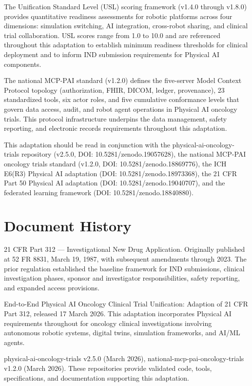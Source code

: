 \documentclass[11pt]{article}
\begin{document}
The Unification Standard Level (USL) scoring framework (v1.4.0 through v1.8.0) provides quantitative readiness assessments for robotic platforms across four dimensions: simulation switching, AI integration, cross-robot sharing, and clinical trial collaboration. USL scores range from 1.0 to 10.0 and are referenced throughout this adaptation to establish minimum readiness thresholds for clinical deployment and to inform IND submission requirements for Physical AI components.

The national MCP-PAI standard (v1.2.0) defines the five-server Model Context Protocol topology (authorization, FHIR, DICOM, ledger, provenance), 23 standardized tools, six actor roles, and five cumulative conformance levels that govern data access, audit, and robot agent operations in Physical AI oncology trials. This protocol infrastructure underpins the data management, safety reporting, and electronic records requirements throughout this adaptation.

This adaptation should be read in conjunction with the physical-ai-oncology-trials repository (v2.5.0, DOI: 10.5281/zenodo.19057628), the national MCP-PAI oncology trials standard (v1.2.0, DOI: 10.5281/zenodo.18869776), the ICH E6(R3) Physical AI adaptation (DOI: 10.5281/zenodo.18973368), the 21 CFR Part 50 Physical AI adaptation (DOI: 10.5281/zenodo.19040707), and the federated learning framework (DOI: 10.5281/zenodo.18840880).

\section*{Document History}

\begin{description}[leftmargin=3.8cm,style=sameline]
\item[Prior Regulation] 21 CFR Part 312 --- Investigational New Drug Application. Originally published at 52 FR 8831, March 19, 1987, with subsequent amendments through 2023. The prior regulation established the baseline framework for IND submissions, clinical investigation phases, sponsor and investigator responsibilities, safety reporting, and expanded access provisions.
\item[Current Adaptation] End-to-End Physical AI Oncology Clinical Trial Unification: Adaption of 21 CFR Part 312, released 17 March 2026. This adaptation incorporates Physical AI requirements throughout for oncology clinical investigations involving autonomous robotic systems, digital twins, simulation frameworks, and AI/ML agents.
\item[Repository Refs] physical-ai-oncology-trials v2.5.0 (March 2026), national-mcp-pai-oncology-trials v1.2.0 (March 2026). These repositories provide validated code, tools, specifications, and documentation supporting this adaptation.
\end{description}
\end{document}
